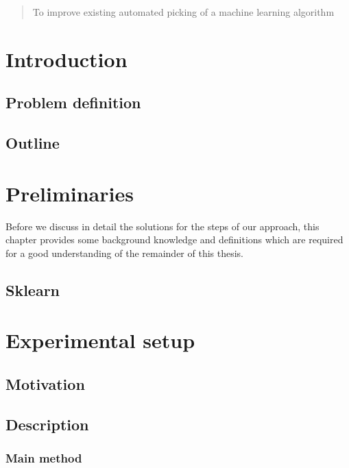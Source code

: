 \documentclass[a4paper,10pt]{article}
\begin{document}
\begin{abstract}
To improve existing automated picking of a machine learning algorithm

\end{abstract}

\newpage
\tableofcontents
\newpage


\section{Introduction} \label{Chapter1}


\subsection{Problem definition}


\subsection{Outline}

\newpage


\section{Preliminaries} \label{Chapter2}
Before we discuss in detail the solutions for the steps of our approach, this chapter provides
some background knowledge and definitions which are required for a good understanding of
the remainder of this thesis.
\subsection{Sklearn}

\newpage
\section{Experimental setup} \label{Chapter3}
\subsection{Motivation} \label{motivation}


\newpage
\subsection{Description} \label{description}


\subsubsection{Main method}
\end{document}
